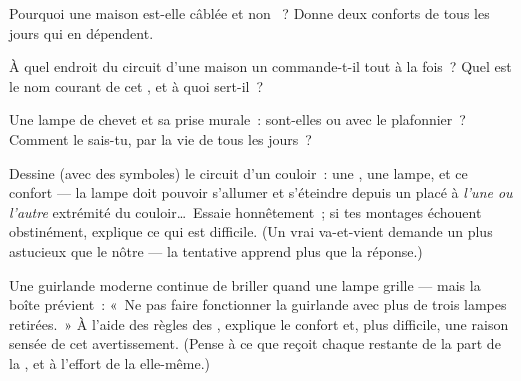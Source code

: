 \begin{exercise}[$\star$]\label{exo:g5:series-parallel-circuits:6}
Pourquoi une maison est-elle câblée  et non ~?
Donne deux conforts de tous les jours qui en dépendent.
\end{exercise}

\begin{exercise}[$\star$]\label{exo:g5:series-parallel-circuits:7}
À quel endroit du circuit d'une maison un  commande-t-il
tout à la fois~? Quel est le nom courant de cet , et à
quoi sert-il~?
\end{exercise}

\begin{exercise}[$\star$]\label{exo:g5:series-parallel-circuits:8}
Une lampe de chevet et sa prise murale~: sont-elles  ou  avec le plafonnier~? Comment le sais-tu, par la vie de
tous les jours~?
\end{exercise}

\begin{exercise}[$\star\star$]\label{exo:g5:series-parallel-circuits:9}
Dessine (avec des symboles) le circuit d'un couloir~: une , une
lampe, et ce confort --- la lampe doit pouvoir s'allumer et
s'éteindre depuis un  placé à \emph{l'une ou l'autre}
extrémité du couloir\dots\ Essaie honnêtement~; si tes montages
échouent obstinément, explique ce qui est difficile. (Un vrai
va-et-vient demande un  plus astucieux que le nôtre ---
la tentative apprend plus que la réponse.)
\end{exercise}

\begin{exercise}[$\star\star$]\label{exo:g5:series-parallel-circuits:10}
Une guirlande moderne continue de briller quand une lampe grille ---
mais la boîte prévient~: «~Ne pas faire fonctionner la guirlande avec
plus de trois lampes retirées.~» À l'aide des règles des ,
explique le confort et, plus difficile, une raison sensée de cet
avertissement. (Pense à ce que reçoit chaque  restante de la
part de la , et à l'effort de la  elle-même.)
\end{exercise}

